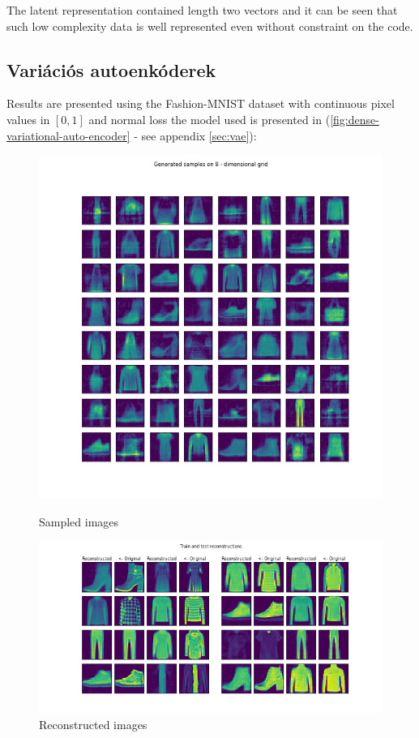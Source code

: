 \documentclass[12pt, english]{article}
\begin{document}
\par The latent representation contained length two vectors and it can be seen that such low complexity data is well represented even without constraint on the code.

\newpage

\subsection{Variációs autoenkóderek}

\vspace{5mm}

\par Results are presented using the Fashion-MNIST dataset with continuous pixel values in $[0, 1]$ and normal loss the model used is presented in (\ref{fig:dense-variational-auto-encoder} - see appendix \ref{sec:vae}):

\vspace{4mm}

\begin{figure}[ht] 
  \label{fig:auto_encoder_results} 
  \begin{minipage}{0.5\linewidth}
    \centering
    \includegraphics[width=.65\linewidth]{gen/generated_samples_fashion_mnist_dense_vae.png} 
    \caption{Sampled images} 
  \end{minipage}%
  \begin{minipage}{0.5\linewidth}
    \centering
    \includegraphics[width=.95\linewidth]{reco/reconstrunction_samples_fashion_mnist_dense_vae.png} 
    \caption{Reconstructed images} 
  \end{minipage} 
\end{figure}
\end{document}
